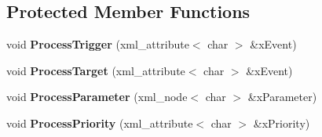\subsection*{Protected Member Functions}
\begin{DoxyCompactItemize}
\item 
\hypertarget{class_k_g_e_1_1_event_signal_adf65006b13b9dbb167490670879c9669}{void {\bfseries Process\-Trigger} (xml\-\_\-attribute$<$ char $>$ \&x\-Event)}\label{class_k_g_e_1_1_event_signal_adf65006b13b9dbb167490670879c9669}

\item 
\hypertarget{class_k_g_e_1_1_event_signal_a8dbace77a099c11639225f133020af3d}{void {\bfseries Process\-Target} (xml\-\_\-attribute$<$ char $>$ \&x\-Event)}\label{class_k_g_e_1_1_event_signal_a8dbace77a099c11639225f133020af3d}

\item 
\hypertarget{class_k_g_e_1_1_event_signal_a54a97ca4837f3e2131ebf962d59d4002}{void {\bfseries Process\-Parameter} (xml\-\_\-node$<$ char $>$ \&x\-Parameter)}\label{class_k_g_e_1_1_event_signal_a54a97ca4837f3e2131ebf962d59d4002}

\item 
\hypertarget{class_k_g_e_1_1_event_signal_a055beb2edc99f655ed74dec80464d953}{void {\bfseries Process\-Priority} (xml\-\_\-attribute$<$ char $>$ \&x\-Priority)}\label{class_k_g_e_1_1_event_signal_a055beb2edc99f655ed74dec80464d953}

\end{DoxyCompactItemize}
